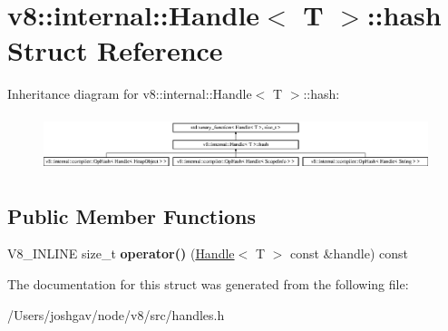 \hypertarget{structv8_1_1internal_1_1_handle_1_1hash}{}\section{v8\+:\+:internal\+:\+:Handle$<$ T $>$\+:\+:hash Struct Reference}
\label{structv8_1_1internal_1_1_handle_1_1hash}
Inheritance diagram for v8\+:\+:internal\+:\+:Handle$<$ T $>$\+:\+:hash\+:\begin{figure}[H]
\begin{center}
\leavevmode
\includegraphics[height=1.632653cm]{structv8_1_1internal_1_1_handle_1_1hash}
\end{center}
\end{figure}
\subsection*{Public Member Functions}
\begin{DoxyCompactItemize}
\item 
V8\+\_\+\+I\+N\+L\+I\+NE size\+\_\+t {\bfseries operator()} (\hyperlink{classv8_1_1internal_1_1_handle}{Handle}$<$ T $>$ const \&handle) const \hypertarget{structv8_1_1internal_1_1_handle_1_1hash_a70ad572a0267364da30f8001406bc4b6}{}\label{structv8_1_1internal_1_1_handle_1_1hash_a70ad572a0267364da30f8001406bc4b6}

\end{DoxyCompactItemize}


The documentation for this struct was generated from the following file\+:\begin{DoxyCompactItemize}
\item 
/\+Users/joshgav/node/v8/src/handles.\+h\end{DoxyCompactItemize}
